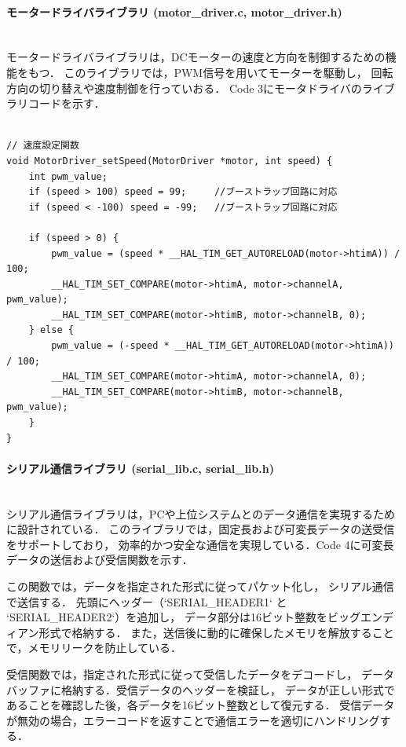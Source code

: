 \paragraph{モータードライバライブラリ (motor\_driver.c, motor\_driver.h)}\mbox{}\\
モータードライバライブラリは，DCモーターの速度と方向を制御するための機能をもつ．
このライブラリでは，PWM信号を用いてモーターを駆動し，
回転方向の切り替えや速度制御を行っていおる．
Code 3にモータドライバのライブラリコードを示す．

\lstset{language=C, caption=モーターの速度設定 (motor\_driver.c)}

\begin{lstlisting}

// 速度設定関数
void MotorDriver_setSpeed(MotorDriver *motor, int speed) {
    int pwm_value;
    if (speed > 100) speed = 99;     //ブーストラップ回路に対応
    if (speed < -100) speed = -99;   //ブーストラップ回路に対応
        
    if (speed > 0) {
        pwm_value = (speed * __HAL_TIM_GET_AUTORELOAD(motor->htimA)) / 100;
        __HAL_TIM_SET_COMPARE(motor->htimA, motor->channelA, pwm_value);
        __HAL_TIM_SET_COMPARE(motor->htimB, motor->channelB, 0);
    } else {
        pwm_value = (-speed * __HAL_TIM_GET_AUTORELOAD(motor->htimA)) / 100;
        __HAL_TIM_SET_COMPARE(motor->htimA, motor->channelA, 0);
        __HAL_TIM_SET_COMPARE(motor->htimB, motor->channelB, pwm_value);
    }
}
\end{lstlisting}
\newpage

\paragraph{シリアル通信ライブラリ (serial\_lib.c, serial\_lib.h)}\mbox{}\\
シリアル通信ライブラリは，PCや上位システムとのデータ通信を実現するために設計されている．
このライブラリでは，固定長および可変長データの送受信をサポートしており，
効率的かつ安全な通信を実現している．Code 4に可変長データの送信および受信関数を示す．

この関数では，データを指定された形式に従ってパケット化し，
シリアル通信で送信する．
先頭にヘッダー（`SERIAL\_HEADER1` と `SERIAL\_HEADER2`）を追加し，
データ部分は16ビット整数をビッグエンディアン形式で格納する．
また，送信後に動的に確保したメモリを解放することで，メモリリークを防止している．

受信関数では，指定された形式に従って受信したデータをデコードし，
データバッファに格納する．受信データのヘッダーを検証し，
データが正しい形式であることを確認した後，各データを16ビット整数として復元する．
受信データが無効の場合，エラーコードを返すことで通信エラーを適切にハンドリングする．

